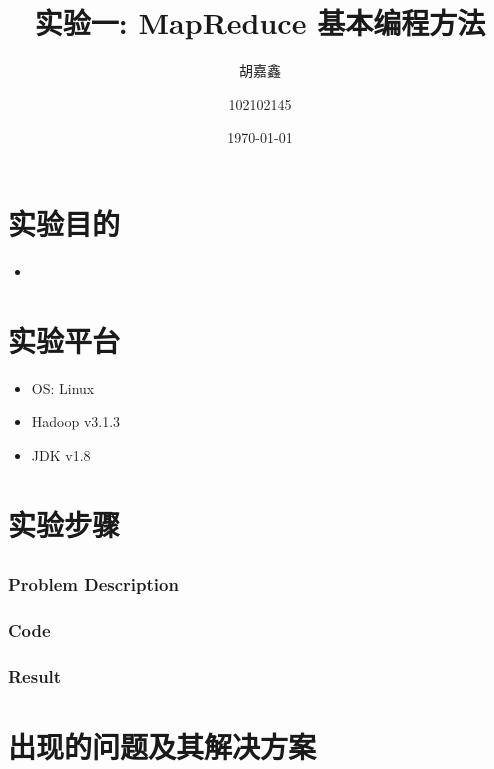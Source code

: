 \documentclass{article}
\title{实验一: MapReduce 基本编程方法}
\author{胡嘉鑫 \and 102102145}
\date{\today}
\begin{document}
    \maketitle
    \tableofcontents

    \section{实验目的}
    \begin{itemize}
      \item
    \end{itemize}

    \section{实验平台}
    \begin{itemize}
      \item OS: Linux
      \item Hadoop v3.1.3
      \item JDK v1.8
    \end{itemize}

    \section{实验步骤}

    \subsection{}
    \subsubsection{Problem Description}
    \subsubsection{Code}
    \subsubsection{Result}

    \section{出现的问题及其解决方案}
\end{document}
